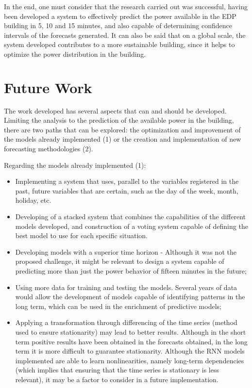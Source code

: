 In the end, one must consider that the research carried out was successful, having been developed a system to effectively predict the power available in the \ac{EDP} building in 5, 10 and 15 minutes, and also capable of determining confidence intervals of the forecasts generated. It can also be said that on a global scale, the system developed contributes to a more sustainable building, since it helps to optimize the power distribution in the building.



\newpage
\section{Future Work}

The work developed has several aspects that can and should be developed. Limiting the analysis to the prediction of the available power in the building, there are two paths that can be explored: the optimization and improvement of the models already implemented (1) or the creation and implementation of new forecasting methodologies (2). 

Regarding the models already implemented (1):   

\begin{itemize}
\setlength\itemsep{0.1em}
    \item Implementing a system that uses, parallel to the variables registered in the past, future variables that are certain, such as the day of the week, month, holiday, etc.
    \item Developing of a stacked system that combines the capabilities of the different models developed, and construction of a voting system capable of defining the best model to use for each specific situation.
    \item Developing models with a superior time horizon - Although it was not the proposed challenge, it might be relevant to design a system capable of predicting more than just the power behavior of fifteen minutes in the future;
    \item Using more data for training and testing the models. Several years of data would allow the development of models capable of identifying patterns in the long term, which can be used in the enrichment of predictive models;
    \item Applying a transformation through differencing  of the time series (method used to ensure stationarity) may lead to better results. Although in the short term positive results have been obtained in the forecasts obtained, in the long term it is more difficult to guarantee stationarity. Although the \ac{RNN} models implemented are able to learn nonlinearities, namely long-term dependencies (which implies that ensuring that the time series is stationary is less relevant), it may be a factor to consider in a future implementation.
\end{itemize}


